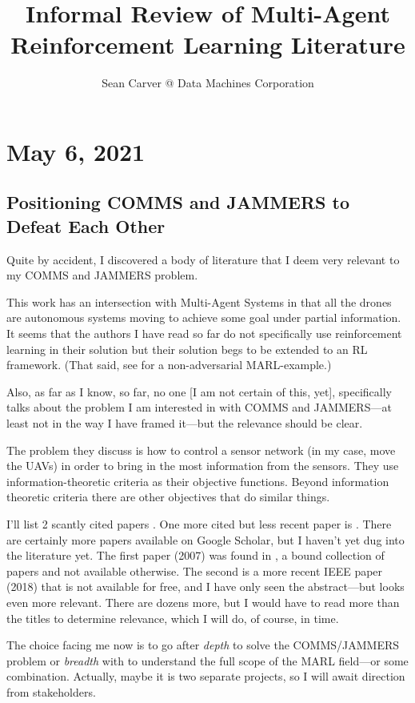 \documentclass{article}
\title{Informal Review of Multi-Agent Reinforcement Learning Literature}
\author{Sean Carver @ Data Machines Corporation}
\begin{document}
\maketitle

\section{May 6, 2021}
\subsection{Positioning COMMS and JAMMERS to Defeat Each Other}
Quite by accident, I discovered a body of literature that I deem very
relevant to my COMMS and JAMMERS problem.

This work has an intersection with Multi-Agent Systems in that all the
drones are autonomous systems moving to achieve some goal under
partial information.  It seems that the authors I have read so far do
not specifically use reinforcement learning in their solution but
their solution begs to be extended to an RL framework.  (That said,
see \cite{testi2020reinforcement} for a non-adversarial MARL-example.)

Also, as far as I know, so far, no one [I am not certain of this,
yet], specifically talks about the problem I am interested in with
COMMS and JAMMERS---at least not in the way I have framed it---but the
relevance should be clear.

The problem they discuss is how to control a sensor network (in my
case, move the UAVs) in order to bring in the most information from
the sensors.  They use information-theoretic criteria as their
objective functions.  Beyond information theoretic criteria there are
other objectives that do similar things.

I'll list 2 scantly cited papers \cite{nicholson2007information,
  guerra2018collaborative}.  One more cited but less recent paper is
\cite{grocholsky2003scalable}.  There are certainly more papers
available on Google Scholar, but I haven't yet dug into the literature
yet.  The first paper (2007) was found in \cite{pechoucek2008defense},
a bound collection of papers and not available otherwise.  The second
is a more recent IEEE paper (2018) that is not available for free, and
I have only seen the abstract---but looks even more relevant.  There
are dozens more, but I would have to read more than the titles to
determine relevance, which I will do, of course, in time.

The choice facing me now is to go after \emph{depth} to solve the
COMMS/JAMMERS problem or \emph{breadth} with to understand the full
scope of the MARL field---or some combination.  Actually, maybe it is
two separate projects, so I will await direction from stakeholders.

\nocite{*}



\end{document}
